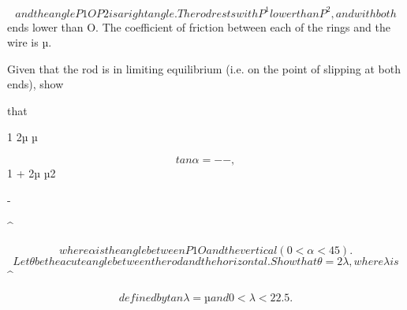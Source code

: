\documentclass[12pt]{article}
\begin{document}
\begin{flushleft}
\[and the angle P1OP2 is a right angle. The rod rests with P^1 lower than P^2, and with both\]
ends lower than O. The coefficient of friction between each of the rings and the wire is µ.\par
Given that the rod is in limiting equilibrium (i.e. on the point of slipping at both ends), show\par
that\par
1 2µ µ\par
\[tan α = - - ,\]
1 + 2µ µ2\par
-\par
\textasciicircum{}\circ\par
\[where α is the angle between P1O and the vertical (0 < α < 45 ).\]
\[Let θ be the acute angle between the rod and the horizontal. Show that θ = 2λ, where λ is\]
\textasciicircum{}\circ\par
\[defined by tan λ = µ and 0 < λ < 22.5 .\]
\end{flushleft}
\end{document}
